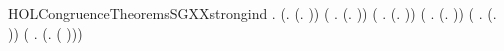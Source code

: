 \newcommand{\HOLCongruenceTheoremsSGXXSEQXXstrongXXinduction}{\UseVerbatim{HOLCongruenceTheoremsSGXXSEQXXstrongXXinduction}}
\begin{SaveVerbatim}{HOLCongruenceTheoremsSGXXstrongind}
\HOLTokenTurnstile{} \HOLSymConst{\HOLTokenForall{}}.
       (\HOLSymConst{\HOLTokenForall{}}.  (\HOLTokenLambda{}. )) \HOLSymConst{\HOLTokenConj{}}
       (\HOLSymConst{\HOLTokenForall{}} .   \HOLSymConst{\HOLTokenImp{}}  (\HOLTokenLambda{}.   )) \HOLSymConst{\HOLTokenConj{}}
       (\HOLSymConst{\HOLTokenForall{}} .   \HOLSymConst{\HOLTokenConj{}}   \HOLSymConst{\HOLTokenImp{}}  (\HOLTokenLambda{}.  )) \HOLSymConst{\HOLTokenConj{}}
       (\HOLSymConst{\HOLTokenForall{}} .
              \HOLSymConst{\HOLTokenConj{}}   \HOLSymConst{\HOLTokenConj{}}   \HOLSymConst{\HOLTokenConj{}}   \HOLSymConst{\HOLTokenImp{}}
             (\HOLTokenLambda{}.   \HOLSymConst{\ensuremath{+}}  )) \HOLSymConst{\HOLTokenConj{}}
       (\HOLSymConst{\HOLTokenForall{}} .
              \HOLSymConst{\HOLTokenConj{}}   \HOLSymConst{\HOLTokenConj{}}   \HOLSymConst{\HOLTokenConj{}}   \HOLSymConst{\HOLTokenImp{}}
             (\HOLTokenLambda{}.   \HOLSymConst{\ensuremath{\parallel}}  )) \HOLSymConst{\HOLTokenConj{}}
       (\HOLSymConst{\HOLTokenForall{}} .   \HOLSymConst{\HOLTokenConj{}}   \HOLSymConst{\HOLTokenImp{}}  (\HOLTokenLambda{}. \HOLConst{\ensuremath{\nu}}  ( ))) \HOLSymConst{\HOLTokenConj{}}

\end{SaveVerbatim}

